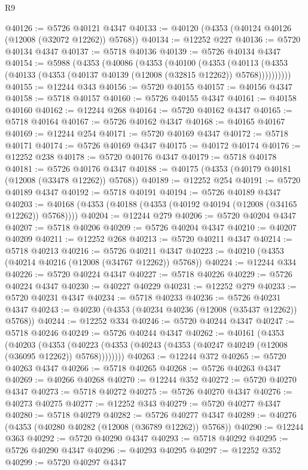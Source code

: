 \begin{lexlean}{R9}
\begin{coremodule}
@40126 := @5726 @40121 @4347
@40133 := @40120 (@4353 (@40124 @40126 (@12008 (@32072 @12262)) @5768))
@40134 := @12252 @227
@40136 := @5720 @40134 @4347
@40137 := @5718 @40136
@40139 := @5726 @40134 @4347
@40154 := @5988
    (@4353
      (@40086
        (@4353
          (@40100
            (@4353
              (@40113 (@4353 (@40133 (@4353 (@40137 @40139 (@12008 (@32815 @12262)) @5768))))))))))
@40155 := @12244 @343
@40156 := @5720 @40155
@40157 := @40156 @4347
@40158 := @5718 @40157
@40160 := @5726 @40155 @4347
@40161 := @40158 @40160
@40162 := @12244 @268
@40164 := @5720 @40162 @4347
@40165 := @5718 @40164
@40167 := @5726 @40162 @4347
@40168 := @40165 @40167
@40169 := @12244 @254
@40171 := @5720 @40169 @4347
@40172 := @5718 @40171
@40174 := @5726 @40169 @4347
@40175 := @40172 @40174
@40176 := @12252 @238
@40178 := @5720 @40176 @4347
@40179 := @5718 @40178
@40181 := @5726 @40176 @4347
@40188 := @40175 (@4353 (@40179 @40181 (@12008 (@33478 @12262)) @5768))
@40189 := @12252 @254
@40191 := @5720 @40189 @4347
@40192 := @5718 @40191
@40194 := @5726 @40189 @4347
@40203 := @40168 (@4353 (@40188 (@4353 (@40192 @40194 (@12008 (@34165 @12262)) @5768))))
@40204 := @12244 @279
@40206 := @5720 @40204 @4347
@40207 := @5718 @40206
@40209 := @5726 @40204 @4347
@40210 := @40207 @40209
@40211 := @12252 @268
@40213 := @5720 @40211 @4347
@40214 := @5718 @40213
@40216 := @5726 @40211 @4347
@40223 := @40210 (@4353 (@40214 @40216 (@12008 (@34767 @12262)) @5768))
@40224 := @12244 @334
@40226 := @5720 @40224 @4347
@40227 := @5718 @40226
@40229 := @5726 @40224 @4347
@40230 := @40227 @40229
@40231 := @12252 @279
@40233 := @5720 @40231 @4347
@40234 := @5718 @40233
@40236 := @5726 @40231 @4347
@40243 := @40230 (@4353 (@40234 @40236 (@12008 (@35437 @12262)) @5768))
@40244 := @12252 @334
@40246 := @5720 @40244 @4347
@40247 := @5718 @40246
@40249 := @5726 @40244 @4347
@40262 := @40161
    (@4353
      (@40203
        (@4353 (@40223 (@4353 (@40243 (@4353 (@40247 @40249 (@12008 (@36095 @12262)) @5768))))))))
@40263 := @12244 @372
@40265 := @5720 @40263 @4347
@40266 := @5718 @40265
@40268 := @5726 @40263 @4347
@40269 := @40266 @40268
@40270 := @12244 @352
@40272 := @5720 @40270 @4347
@40273 := @5718 @40272
@40275 := @5726 @40270 @4347
@40276 := @40273 @40275
@40277 := @12252 @343
@40279 := @5720 @40277 @4347
@40280 := @5718 @40279
@40282 := @5726 @40277 @4347
@40289 := @40276 (@4353 (@40280 @40282 (@12008 (@36789 @12262)) @5768))
@40290 := @12244 @363
@40292 := @5720 @40290 @4347
@40293 := @5718 @40292
@40295 := @5726 @40290 @4347
@40296 := @40293 @40295
@40297 := @12252 @352
@40299 := @5720 @40297 @4347

\end{coremodule}
\end{lexlean}
